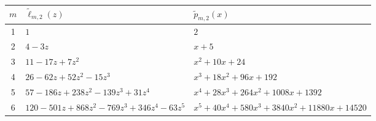 \documentclass[12pt,reqno]{article}
\numberwithin{sfootnote}{section}
\newcommand{\subtableskip}{\bigskip}
\newcommand{\tabletopstrut}[0]{\rule{0pt}{3ex}}
\numberwithin{equation}{section}
\theoremstyle{DefaultTheoremStyle}
\theoremstyle{definition}
\begin{document}
\begin{table}[h] 
\centering 

\smaller 

\begin{subtable}{\textwidth} 
\centering 

\begin{tabular}{|c|l|l|} \hline 
\hline\tabletopstrut 
$m$ & $\widetilde{\ell}_{m,2}(z)$ & $\widetilde{p}_{m,2}(x)$ \\ \hline 
1 & $1$ & $2$ \\ 
2 & $4 - 3z$ & $x+5$ \\ 
3 & $11 - 17z + 7z^2$ & $ x^2+10x+24$ \\ 
4 & $26 - 62z + 52z^2  - 15z^3$ & $x^3+18x^2+96x+192$ \\ 
5 & $57 - 186z + 238z^2 - 139z^3 + 31z^4$ & 
    $x^4+28x^3+264x^2+1008x+1392$ \\ %
6 & $120 - 501z + 868z^2 - 769z^3 + 346z^4 - 63z^5$ & 
    $x^5 + 40x^4+580x^3 + 3840x^2+11880x + 14520$ \\ \hline 
\hline 
\end{tabular} 

\subtableskip 


\end{subtable}
\end{table}
\end{document}
